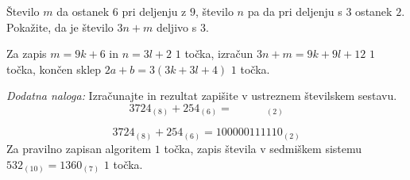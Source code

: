 \documentclass[addpoints]{exam}
\begin{document}
\begin{questions}
    

\newpage
    \question[3]
    Število $m$ da ostanek $6$ pri deljenju z $9$, število $n$ pa da pri deljenju s $3$ ostanek $2$.
    Pokažite, da je število $3n+m$ deljivo s $3$.
    
    \begin{solution}[3cm]
        Za zapis $m=9k+6$ in $n=3l+2$ $1$ točka, izračun $3n+m=9k+9l+12$ $1$ točka, končen sklep $2a+b=3(3k+3l+4)$ $1$ točka.
    \end{solution}

        




     \newpage

    \bonusquestion[3]
    \textit{Dodatna naloga:} Izračunajte in rezultat zapišite v ustreznem številskem sestavu.
                $$ 3724_{(8)}+ 254_{(6)}= \quad \quad \quad _{(2)} $$

    \begin{solution}[7cm]
        $$ 3724_{(8)}+ 254_{(6)}= 100000111110_{(2)} $$
        Za pravilno zapisan algoritem $1$ točka, zapis števila v sedmiškem sistemu $532_{(10)}=1360_{(7)}$ $1$ točka.
    \end{solution}




\end{questions}
\end{document}
